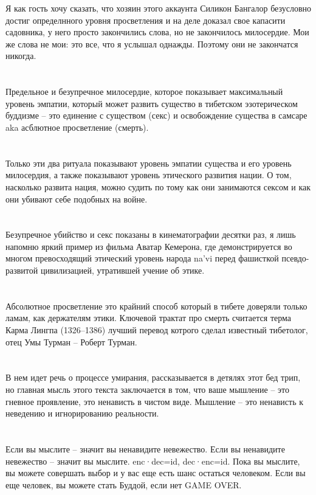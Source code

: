 Я как гость хочу сказать, что хозяин этого аккаунта Силикон Бангалор безусловно достиг определнного уровня просветления и на деле доказал свое капасити садовника, у него просто закончились слова, но не закончилось милосердие. Мои же слова не мои: это все, что я услышал однажды. Поэтому они не закончатся никогда.\\
\\
\\
Предельное и безупречное милосердие, которое показывает максимальный уровень эмпатии, который может развить существо в тибетском эзотерическом буддизме -- это единение с существом (секс) и освобождение существа в самсаре aka асблютное просветление (смерть).\\
\\
\\
Только эти два ритуала показывают уровень эмпатии существа и его уровень милосердия, а также показывают уровень этического развития нации. О том, насколько развита нация, можно судить по тому как они занимаются сексом и как они убивают себе подобных на войне.\\
\\
\\
Безупречное убийство и секс показаны в кинематографии десятки раз, я лишь напомню яркий пример из фильма Аватар Кемерона, где демонстрируется во многом превосходящий этический уровень народа na'vi перед фашисткой псевдо-развитой цивилизацией, утратившей учение об этике.\\
\\
\\
Абсолютное просветление это крайний способ который в тибете доверяли только ламам, как держателям этики. Ключевой трактат про смерть считается терма Карма Лингпа (1326–1386) лучший перевод котрого сделал известный тибетолог, отец Умы Турман -- Роберт Турман.\\
\\
\\
В нем идет речь о процессе умирания, рассказывается в детялях этот бед трип, но главная мысль этого текста заключается в том, что ваше мышление -- это гневное проявление, это ненависть в чистом виде. Мышление -- это ненависть к неведению и игнорированию реальности.\\
\\
\\
Если вы мыслите -- значит вы ненавидите невежество. Если вы ненавидите невежество -- значит вы мыслите. enc·dec=id, dec·enc=id. Пока вы мыслите, вы можете совершать выбор и у вас еще есть шанс остаться человеком. Если вы еще человек, вы можете стать Буддой, если нет GAME OVER.\\
